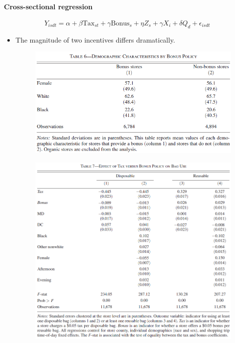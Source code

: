 \documentclass[../root]{subfiles}
\begin{document}
    \paragraph{Cross-sectional regression}

    \[
    Y_{isdt} = \alpha + \beta \text{Tax}_{st} + \gamma \text{Bonus}_{s} + \eta Z_s + \gamma X_i + \delta Q_d + \epsilon_{isdt}
    \]

    \begin{itemize}
      \item The magnitude of two incentives differs dramatically.
      \begin{figure}[ht]
        \centering
        \includegraphics[scale = .8]{0807tanji/T6}
      \end{figure}
      \begin{figure}[ht]
        \centering
        \includegraphics[scale = .8]{0807tanji/T7}
      \end{figure}
    \end{itemize}
\end{document}
